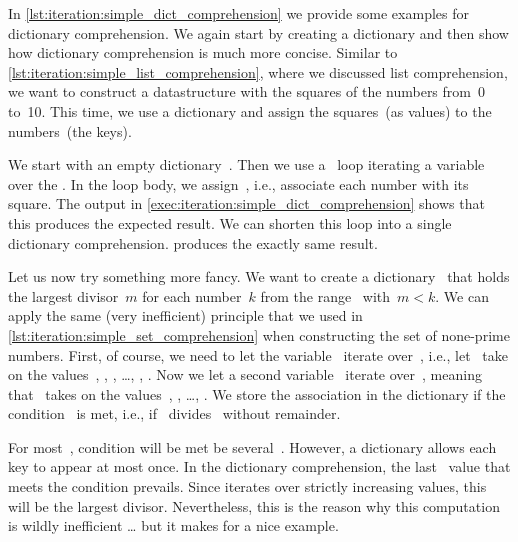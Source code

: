 %
%
%
In \cref{lst:iteration:simple_dict_comprehension} we provide some examples for dictionary comprehension.
We again start by  creating a dictionary and then show how dictionary comprehension is much more concise.
Similar to \cref{lst:iteration:simple_list_comprehension}, where we discussed list comprehension, we want to construct a datastructure with the squares of the numbers from~0 to~10.
This time, we use a dictionary and assign the squares~(as values) to the numbers~(the keys).

We start with an empty dictionary~.
Then we use a ~loop iterating a variable~ over the .
In the loop body, we assign~, i.e., associate each number with its square.
The output in \cref{exec:iteration:simple_dict_comprehension} shows that this produces the expected result.
We can shorten this loop into a single dictionary comprehension.
 produces the exactly same result.

Let us now try something more fancy.
We want to create a dictionary~ that holds the largest divisor~$m$ for each number~$k$ from the range~ with~$m<k$.
We can apply the same (very inefficient) principle that we used in \cref{lst:iteration:simple_set_comprehension} when constructing the set of none-prime numbers.
First, of course, we need to let the variable~ iterate over~, i.e., let~ take on the values~, , , \dots, , .
Now we let a second variable~ iterate over~, meaning that~ takes on the values~, , \dots, .
We store the association  in the dictionary if the condition~ is met, i.e., if~ divides~ without remainder.

For most~, condition will be met be several~.
However, a dictionary allows each key to appear at most once.
In the dictionary comprehension, the last~ value that meets the condition prevails.
Since  iterates over strictly increasing values, this will be the largest divisor.
Nevertheless, this is the reason why this computation is wildly inefficient {\dots} but it makes for a nice example.

